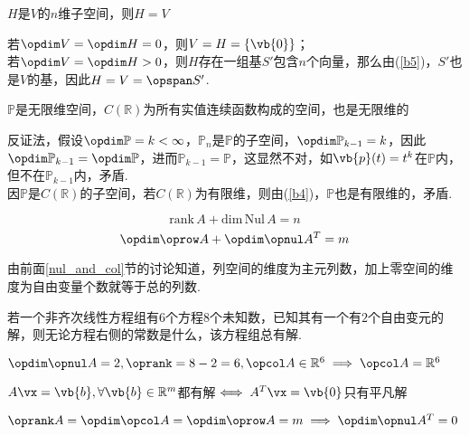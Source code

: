 \begin{theorem}
\begin{partlist}
\begin{analysis}
	\end{analysis}
	\item $H$是$V$的$n$维子空间，则$H=V$
	\begin{analysis}
	若$\opdim V=\opdim H=0$，则$V=H=\{\vb{0}\}$；\\
	若$\opdim V=\opdim H>0$，则$H$存在一组基$S'$包含$n$个向量，那么由(\ref{b5})，$S'$也是$V$的基，因此$H=V=\opspan S'$.
	\end{analysis}
	\item $\mathbb{P}$是无限维空间，$C(\mathbb{R})$为所有实值连续函数构成的空间，也是无限维的
	\begin{analysis}
	反证法，假设$\opdim\mathbb{P}=k<\infty$，$\mathbb{P}_n$是$\mathbb{P}$的子空间，$\opdim\mathbb{P}_{k-1}=k$，因此$\opdim\mathbb{P}_{k-1}=\opdim\mathbb{P}$，进而$\mathbb{P}_{k-1}=\mathbb{P}$，这显然不对，如$\vb{p}(t)=t^k$在$\mathbb{P}$内，但不在$\mathbb{P}_{k-1}$内，矛盾.\\
	因$\mathbb{P}$是$C(\mathbb{R})$的子空间，若$C(\mathbb{R})$为有限维，则由(\ref{b4})，$\mathbb{P}$也是有限维的，矛盾.
	\end{analysis}
\end{partlist}
\end{theorem}
\begin{theorem}[秩定理]
\label{rank_theo}
\[\mathrm{rank}\,A+\mathrm{dim}\,\mathrm{Nul}\,A=n\]
\[\opdim\oprow A+\opdim \opnul A^T=m\]
\end{theorem}
\begin{analysis}
由前面\ref{nul_and_col}节的讨论知道，列空间的维度为主元列数，加上零空间的维度为自由变量个数就等于总的列数.
\end{analysis}
\begin{example}
若一个非齐次线性方程组有$6$个方程$8$个未知数，已知其有一个有$2$个自由变元的解，则无论方程右侧的常数是什么，该方程组总有解.
\end{example}
\begin{analysis}
$\opdim\opnul A=2,\oprank=8-2=6,\opcol A\in\mathbb{R}^6\implies\opcol A=\mathbb{R}^6$
\end{analysis}
\begin{example}
$A\vx=\vb{b},\forall\vb{b}\in\mathbb{R}^m$都有解$\iff A^T\vx=\vb{0}$只有平凡解
\end{example}
\begin{analysis}
$\oprank A=\opdim\opcol A=\opdim\oprow A=m\implies\opdim\opnul A^T=0$
\end{analysis}
